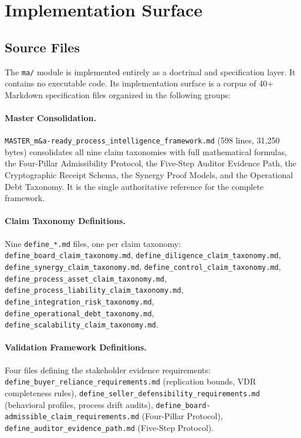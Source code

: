 
\section{Implementation Surface}
\label{sec:ma-implementation}

\subsection{Source Files}
\label{sec:ma-impl-source-files}

The \texttt{ma/} module is implemented entirely as a doctrinal and specification layer. It
contains no executable code. Its implementation surface is a corpus of 40+ Markdown
specification files organized in the following groups:

\paragraph{Master Consolidation.}
\texttt{MASTER\_m\&a-ready\_process\_intelligence\_framework.md} (598 lines, 31,250 bytes)
consolidates all nine claim taxonomies with full mathematical formulas, the Four-Pillar
Admissibility Protocol, the Five-Step Auditor Evidence Path, the Cryptographic Receipt Schema,
the Synergy Proof Models, and the Operational Debt Taxonomy. It is the single authoritative
reference for the complete framework.

\paragraph{Claim Taxonomy Definitions.}
Nine \texttt{define\_*.md} files, one per claim taxonomy:
\texttt{define\_board\_claim\_taxonomy.md}, \texttt{define\_diligence\_claim\_taxonomy.md},
\texttt{define\_synergy\_claim\_taxonomy.md}, \texttt{define\_control\_claim\_taxonomy.md},
\texttt{define\_process\_asset\_claim\_taxonomy.md},
\texttt{define\_process\_liability\_claim\_taxonomy.md},
\texttt{define\_integration\_risk\_taxonomy.md},
\texttt{define\_operational\_debt\_taxonomy.md},
\texttt{define\_scalability\_claim\_taxonomy.md}.

\paragraph{Validation Framework Definitions.}
Four files defining the stakeholder evidence requirements:
\texttt{define\_buyer\_reliance\_requirements.md} (replication bounds, VDR completeness rules),
\texttt{define\_seller\_defensibility\_requirements.md} (behavioral profiles, process drift
audits), \texttt{define\_board-admissible\_claim\_requirements.md} (Four-Pillar Protocol),
\texttt{define\_auditor\_evidence\_path.md} (Five-Step Protocol).

